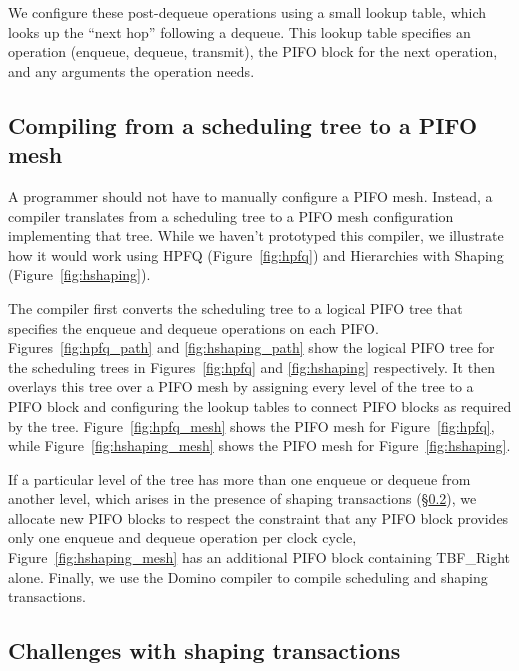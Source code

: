 We configure these post-dequeue operations using a small lookup table, which
looks up the ``next hop'' following a dequeue. This lookup table specifies an
operation (enqueue, dequeue, transmit), the PIFO block for the next operation,
and any arguments the operation needs.

\subsection{Compiling from a scheduling tree to a PIFO mesh}
\label{pifo_ss:compiler}

A programmer should not have to manually configure a PIFO mesh. Instead, a
compiler translates from a scheduling tree to a PIFO mesh configuration implementing that tree.  While we haven't prototyped
this compiler, we illustrate how it would work using HPFQ (Figure~\ref{fig:hpfq})
and Hierarchies with Shaping (Figure~\ref{fig:hshaping}).

The compiler first converts the scheduling tree to a logical PIFO tree that
specifies the enqueue and dequeue operations on each PIFO.
Figures~\ref{fig:hpfq_path} and \ref{fig:hshaping_path} show the logical PIFO tree for
the scheduling trees in Figures~\ref{fig:hpfq} and \ref{fig:hshaping} respectively.  It then overlays
this tree over a PIFO mesh by assigning every level of the tree to a PIFO block
and configuring the lookup tables to connect PIFO blocks as required by the
tree.  Figure~\ref{fig:hpfq_mesh} shows the PIFO mesh for
Figure~\ref{fig:hpfq}, while Figure~\ref{fig:hshaping_mesh} shows the PIFO mesh
for Figure~\ref{fig:hshaping}.

If a particular level of the tree has more than one enqueue or dequeue from
another level, which arises in the presence of shaping transactions
(\S\ref{ss:shape_challenge}), we allocate new PIFO blocks to respect the
constraint that any PIFO block provides only one enqueue and dequeue operation per
clock cycle, \eg Figure~\ref{fig:hshaping_mesh} has an additional PIFO block
containing TBF\_Right alone. Finally, we use the Domino compiler to compile
scheduling and shaping transactions.

\subsection{Challenges with shaping transactions}
\label{ss:shape_challenge}

